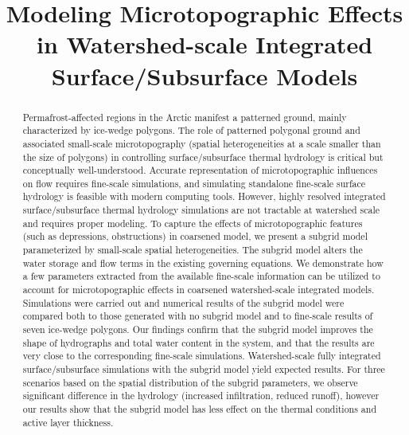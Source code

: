 \documentclass[review,11pt]{elsarticle}
\begin{document}
\begin{frontmatter}

\title{Modeling Microtopographic Effects in Watershed-scale Integrated Surface/Subsurface Models}





\begin{abstract}
Permafrost-affected regions in the Arctic manifest a patterned ground, mainly characterized by ice-wedge polygons. The role of patterned polygonal ground and associated small-scale microtopography (spatial heterogeneities at a scale smaller than the size of polygons) in controlling surface/subsurface thermal hydrology is critical but conceptually well-understood. Accurate representation of microtopographic influences on flow requires fine-scale simulations, and simulating standalone fine-scale surface hydrology is feasible with modern computing tools. However, highly resolved integrated surface/subsurface thermal hydrology simulations are not tractable at watershed scale and requires proper modeling. To capture the effects of microtopographic features (such as depressions, obstructions) in coarsened model, we present a subgrid model parameterized by small-scale spatial heterogeneities.  The subgrid model alters the water storage and flow terms in the existing governing equations. We demonstrate how a few parameters extracted from the available fine-scale information can be utilized to account for microtopographic effects in coarsened watershed-scale integrated models.
Simulations were carried out and numerical results of the subgrid model were compared both to those generated with no subgrid model and to fine-scale results of seven ice-wedge polygons. Our findings confirm that the subgrid model improves the shape of hydrographs and total water content in the system, and that the results are very close to the corresponding fine-scale simulations. Watershed-scale fully integrated surface/subsurface simulations with the subgrid model yield expected results. For three scenarios based on the spatial distribution of the subgrid parameters, we observe significant difference in the hydrology (increased infiltration, reduced runoff), however our results show that the subgrid model has less effect on the thermal conditions and active layer thickness.  
\end{abstract}


\end{frontmatter}
\end{document}
